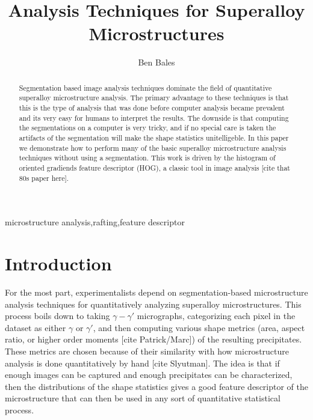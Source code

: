 \documentclass[review]{elsarticle}
\date{}
\begin{document}
	\begin{frontmatter}
		\title{Analysis Techniques for Superalloy Microstructures}

		\author{Ben Bales}
		\address{University of California Santa Barbara}

		\begin{abstract}
			Segmentation based image analysis techniques dominate the field of quantitative superalloy microstructure analysis. The primary advantage to these techniques is that this is the type of analysis that was done before computer analysis became prevalent and its very easy for humans to interpret the results. The downside is that computing the segmentations on a computer is very tricky, and if no special care is taken the artifacts of the segmentation will make the shape statistics unitelligeble. In this paper we demonstrate how to perform many of the basic superalloy microstructure analysis techniques without using a segmentation. This work is driven by the histogram of oriented gradiends feature descriptor (HOG), a classic tool in image analysis [cite that 80s paper here].
		\end{abstract}

		\begin{keyword}
			microstructure analysis\sep rafting\sep feature descriptor
		\end{keyword}
	\end{frontmatter}

	\section{Introduction}
	For the most part, experimentalists depend on segmentation-based microstructure analysis techniques for quantitatively analyzing superalloy microstructures. This process boils down to taking $\gamma-\gamma'$ micrographs, categorizing each pixel in the dataset as either $\gamma$ or $\gamma'$, and then computing various shape metrics (area, aspect ratio, or higher order moments [cite Patrick/Marc]) of the resulting precipitates. These metrics are chosen because of their similarity with how microstructure analysis is done quantitatively by hand [cite Slyutman]. The idea is that if enough images can be captured and enough precipitates can be characterized, then the distributions of the shape statistics gives a good feature descriptor of the microstructure that can then be used in any sort of quantitative statistical process.
\end{document}
